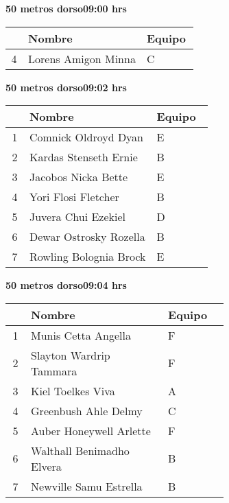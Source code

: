 \begin{minipage}{0.95\linewidth}
\begin{center}
\textbf{
50 metros dorso\hspace{1cm}09:00 hrs}
\end{center}
\begin{tabular}{cp{0.63\linewidth}l}
\hline
& \textbf{Nombre} & \textbf{Equipo} \\ \hline
4 & Lorens Amigon Minna & C \\ 
\end{tabular}
\end{minipage}
\begin{minipage}{0.95\linewidth}
\begin{center}
\textbf{
50 metros dorso\hspace{1cm}09:02 hrs}
\end{center}
\begin{tabular}{cp{0.63\linewidth}l}
\hline
& \textbf{Nombre} & \textbf{Equipo} \\ \hline
1 & Comnick Oldroyd Dyan & E \\ 
2 & Kardas Stenseth Ernie & B \\ 
3 & Jacobos Nicka Bette & E \\ 
4 & Yori Flosi Fletcher & B \\ 
5 & Juvera Chui Ezekiel & D \\ 
6 & Dewar Ostrosky Rozella & B \\ 
7 & Rowling Bolognia Brock & E \\ 
\end{tabular}
\end{minipage}
\begin{minipage}{0.95\linewidth}
\begin{center}
\textbf{
50 metros dorso\hspace{1cm}09:04 hrs}
\end{center}
\begin{tabular}{cp{0.63\linewidth}l}
\hline
& \textbf{Nombre} & \textbf{Equipo} \\ \hline
1 & Munis Cetta Angella & F \\ 
2 & Slayton Wardrip Tammara & F \\ 
3 & Kiel Toelkes Viva & A \\ 
4 & Greenbush Ahle Delmy & C \\ 
5 & Auber Honeywell Arlette & F \\ 
6 & Walthall Benimadho Elvera & B \\ 
7 & Newville Samu Estrella & B \\ 
\end{tabular}
\end{minipage}
